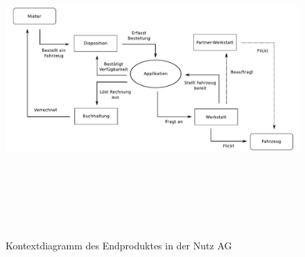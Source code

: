 \begin{center}
  \begin{figure}[ht]
    \includegraphics[height=12cm,width=18cm]{graphics/kontextdiagramm.pdf}
    \caption{Kontextdiagramm des Endproduktes in der Nutz AG}
    \label{fig:awesome_image}
  \end{figure}
\end{center}

